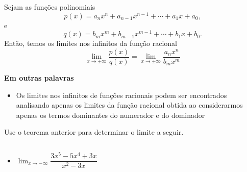 \begin{frame}
  \begin{theorem}[\phantom{ç}]
    Sejam as funções polinomiais $$p(x) = a_{n}x^{n} + a_{n-1}x^{n-1} + \cdots + a_{1}x + a_{0},$$ e $$q(x) = b_{m}x^{m} + b_{m-1}x^{m-1} + \cdots + b_{1}x + b_{0}.$$ Então, temos os limites nos infinitos da função racional
    \begin{equation*}
      \lim_{x\rightarrow\pm\infty}\dfrac{p(x)}{q(x)} = \lim_{x\rightarrow\pm\infty}\dfrac{a_{n}x^{n}}{b_{m}x^{m}}
    \end{equation*}
  \end{theorem}
  \begin{highlight}
    \textbf{Em outras palavras}
    \begin{itemize}
      \item Os limites nos infinitos de funções racionais podem ser encontrados analisando apenas os limites da função racional obtida ao considerarmos apenas os termos dominantes do numerador e do dominador
    \end{itemize}
  \end{highlight}
\end{frame}

\begin{frame}
  \begin{example}
    Use o teorema anterior para determinar o limite a seguir.
  \end{example}
  \begin{columns}[onlytextwidth]
    \begin{column}{0.5\textwidth}
      \begin{itemize}
        \item $\displaystyle\lim_{x\rightarrow-\infty}\dfrac{3x^{5} - 5x^{4} + 3x}{x^{2} - 3x}$
      \end{itemize}
    \end{column}
    \begin{column}{0.5\textwidth}
    \end{column}
  \end{columns}
\end{frame}

